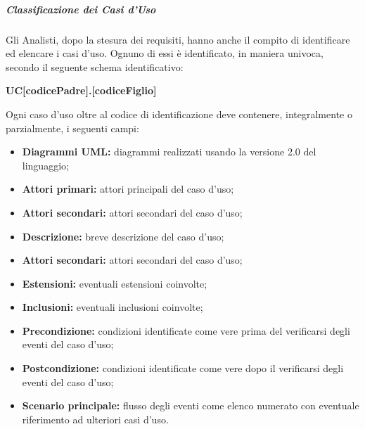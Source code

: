 				\subparagraph{Classificazione dei Casi d'Uso}
					Gli Analisti, dopo la stesura dei requisiti, hanno anche il compito di identificare ed elencare i casi d’uso. Ognuno di essi è identificato, in maniera univoca, secondo il seguente schema identificativo:
					\begin{center}
						\textbf{UC[codicePadre].[codiceFiglio]}
					\end{center}
					Ogni caso d'uso oltre al codice di identificazione deve contenere, integralmente o parzialmente, i seguenti campi:
					\begin{itemize}
						\item \textbf{Diagrammi UML:} diagrammi realizzati usando la versione 2.0 del linguaggio;
						\item \textbf{Attori primari:} attori principali del caso d’uso; 
						\item \textbf{Attori secondari:} attori secondari del caso d’uso;
						\item \textbf{Descrizione:} breve descrizione del caso d'uso;
						\item \textbf{Attori secondari:} attori secondari del caso d’uso;
						\item \textbf{Estensioni:} eventuali estensioni coinvolte;
						\item \textbf{Inclusioni:} eventuali inclusioni coinvolte;
						\item \textbf{Precondizione:} condizioni identificate come vere prima del verificarsi degli eventi del caso d’uso;
						\item \textbf{Postcondizione:} condizioni identificate come vere dopo il verificarsi degli eventi del caso d’uso;
						\item \textbf{Scenario principale:} flusso degli eventi come elenco numerato con eventuale riferimento ad ulteriori casi d’uso.
					\end{itemize}
				

